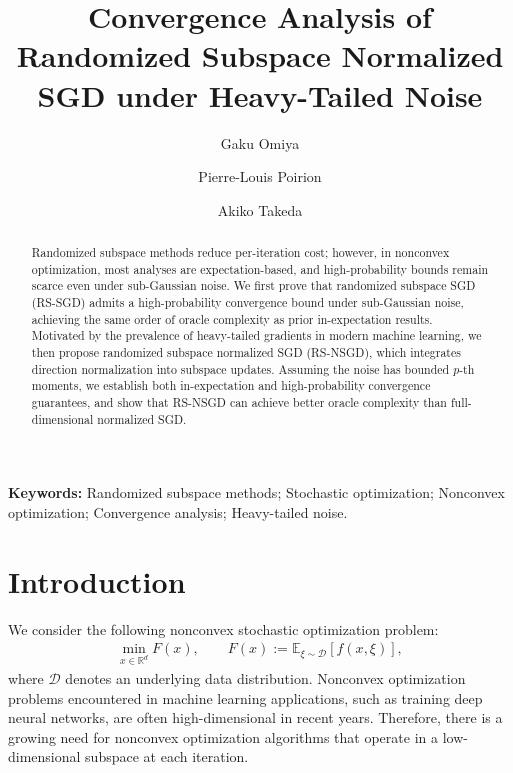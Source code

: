 \documentclass[10pt]{article}
\begin{document}
\title{Convergence Analysis of Randomized Subspace Normalized SGD under Heavy-Tailed Noise}
\author[1,2]{Gaku Omiya}
\author[2]{Pierre-Louis Poirion}
\author[1,2]{Akiko Takeda}


\date{}
\date{}
\maketitle

\begin{abstract}
Randomized subspace methods reduce per-iteration cost; however, in nonconvex optimization, most analyses are expectation-based, and high-probability bounds remain scarce even under sub-Gaussian noise. We first prove that randomized subspace SGD (RS-SGD) admits a high-probability convergence bound under sub-Gaussian noise, achieving the same order of oracle complexity as prior in-expectation results. Motivated by the prevalence of heavy-tailed gradients in modern machine learning, we then propose randomized subspace normalized SGD (RS-NSGD), which integrates direction normalization into subspace updates. Assuming the noise has bounded $p$-th moments, we establish both in-expectation and high-probability convergence guarantees, and show that RS-NSGD can achieve better oracle complexity than full-dimensional normalized SGD.


\end{abstract}

\noindent\textbf{Keywords:} Randomized subspace methods; Stochastic optimization; Nonconvex optimization; Convergence analysis; Heavy-tailed noise.


\section{Introduction}
We consider the following nonconvex stochastic optimization problem:
\begin{align}
    \min_{x \in \mathbb{R}^d} F(x), \qquad
    F(x) := \mathbb{E}_{\xi \sim \mathcal{D}}[f(x,\xi)],
    \label{eq:sto_opt}
\end{align}
where $\mathcal{D}$ denotes an underlying data distribution. Nonconvex
optimization problems encountered in machine learning applications, such as training
deep neural networks, are often high-dimensional in recent years. 
Therefore, there is a growing need for nonconvex optimization algorithms that operate in a low-dimensional subspace at each iteration.
\end{document}
